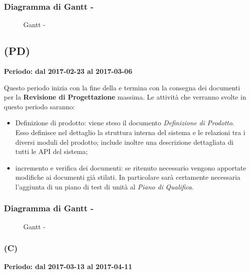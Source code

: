 \documentclass[./PianoDiProgetto.tex]{subfiles}
\begin{document}
  \subsubsection{Diagramma di Gantt - \PerPA}
    \begin{figure}[!h]
    \centering
    \caption{Gantt - \PerPA}
    \end{figure}

  \subsection{\PerPD{} (PD)}
  \textbf{Periodo: dal 2017-02-23 al 2017-03-06}

  Questo periodo inizia con la fine della \PerPA e termina con la consegna dei documenti per la \textbf{Revisione di Progettazione} massima. Le attività che verranno svolte in questo periodo saranno:
  \begin{itemize}
    \item Definizione di prodotto: viene steso il documento \textit{Definizione di Prodotto}. Esso definisce nel dettaglio la struttura interna del sistema e le relazioni tra i diversi moduli del prodotto; include inoltre una descrizione dettagliata di tutti le API del sistema;
    \item incremento e verifica dei documenti: se ritenuto necessario vengono apportate modifiche ai documenti già stilati. In particolare sarà certamente necessaria l'aggiunta di un piano di test di unità al \textit{Piano di Qualifica}.
  \end{itemize}

  \subsubsection{Diagramma di Gantt - \PerPD}
    \begin{figure}[!h]
    \centering
    \caption{Gantt - \PerPD}
    \end{figure}

  \subsubsection{\PerC{} (C)}
  \textbf{Periodo: dal 2017-03-13 al 2017-04-11}
\end{document}
